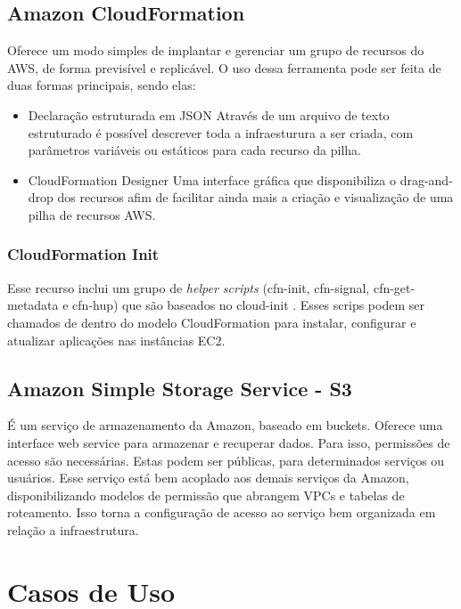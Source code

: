 \documentclass[tg]{mdtufsm}
\begin{document}
\subsection{Amazon CloudFormation}

Oferece um modo simples de implantar e gerenciar um grupo de recursos do AWS, de forma previsível e replicável. O uso dessa ferramenta pode ser feita de duas formas principais, sendo elas:

\begin{itemize}
\item{Declaração estruturada em JSON}
Através de um arquivo de texto estruturado é possível descrever toda a infraesturura a ser criada, com parâmetros variáveis ou estáticos para cada recurso da pilha.

\item{CloudFormation Designer}
Uma interface gráfica que disponibiliza o drag-and-drop dos recursos afim de facilitar ainda mais a criação e visualização de uma pilha de recursos AWS.
\end{itemize}

\subsubsection{CloudFormation Init}

Esse recurso inclui um grupo de \emph{helper scripts} (cfn-init, cfn-signal, cfn-get-metadata e cfn-hup) que são baseados no cloud-init \cite{awsinit}. Esses scrips podem ser chamados de dentro do modelo CloudFormation para instalar, configurar e atualizar aplicações nas instâncias EC2.

\subsection{Amazon Simple Storage Service - S3}

É um serviço de armazenamento da Amazon, baseado em buckets. Oferece uma interface web service para armazenar e recuperar dados. Para isso, permissões de acesso são necessárias. Estas podem ser públicas, para determinados serviços ou usuários. Esse serviço está bem acoplado aos demais serviços da Amazon, disponibilizando modelos de permissão que abrangem VPCs e tabelas de roteamento. Isso torna a configuração de acesso ao serviço bem organizada em relação a infraestrutura.

\section{Casos de Uso}
\end{document}
